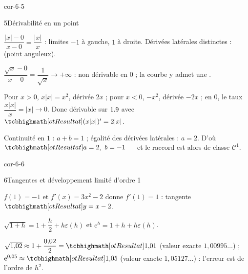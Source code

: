 \begin{blocLivre}{cor-6-5}
\begin{corrige}{5}{Dérivabilité en un point}
\begin{questions}
  \item $\dfrac{|x|-0}{x-0}=\dfrac{|x|}{x}$ : limites $-1$ à gauche, $1$ à
    droite. Dérivées latérales distinctes : 
    (point anguleux).
  \item $\dfrac{\sqrt x-0}{x-0}=\dfrac{1}{\sqrt x}\to+\infty$ : non
    dérivable en $0$ ; la courbe y admet une .
  \item Pour $x>0$, $x|x|=x^{2}$, dérivée $2x$ ; pour $x<0$, $-x^{2}$,
    dérivée $-2x$ ; en $0$, le taux $\dfrac{x|x|}{x}=|x|\to0$. Donc
    dérivable sur $1.9$ avec $\res{(x|x|)'=2|x|}$.
  \item Continuité en $1$ : $a+b=1$ ; égalité des dérivées latérales :
    $a=2$. D'où $\res{a=2,\ b=-1}$ — et le raccord est alors de classe
    $\mathscr{C}^{1}$.
\end{questions}
\end{corrige}
\end{blocLivre}

\begin{blocLivre}{cor-6-6}
\begin{corrige}{6}{Tangentes et développement limité d'ordre 1}
\begin{questions}
  \item $f(1)=-1$ et $f'(x)=3x^{2}-2$ donne $f'(1)=1$ : tangente
    $\res{y=x-2}$.
  \item $\sqrt{1+h}=1+\dfrac{h}{2}+h\varepsilon(h)$ et
    $\mathrm{e}^{h}=1+h+h\varepsilon(h)$.
  \item $\sqrt{1{,}02}\approx1+\dfrac{0{,}02}{2}=\res{1{,}01}$ (valeur
    exacte $1{,}00995\dots$) ; $\mathrm{e}^{0{,}05}\approx\res{1{,}05}$
    (valeur exacte $1{,}05127\dots$) : l'erreur est de l'ordre de $h^{2}$.
\end{questions}
\end{corrige}
\end{blocLivre}

